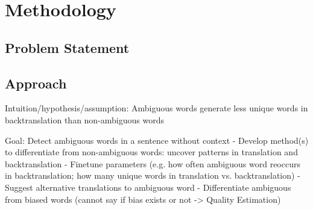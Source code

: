 \chapter{Methodology}
\label{ch:Methodology}

\section{Problem Statement}
\label{sec:Methodology:Problem}

\section{Approach}
\label{sec:Methodology:Approach}


Intuition/hypothesis/assumption: Ambiguous words generate less unique words in backtranslation than non-ambiguous words



Goal: Detect ambiguous words in a sentence without context
	- Develop method(s) to differentiate from non-ambiguous words: uncover patterns in translation and backtranslation
	- Finetune parameters (e.g. how often ambiguous word reoccurs in backtranslation; how many unique words in translation vs. backtranslation)
	- Suggest alternative translations to ambiguous word
    - Differentiate ambiguous from biased words (cannot say if bias exists or not -> Quality Estimation)